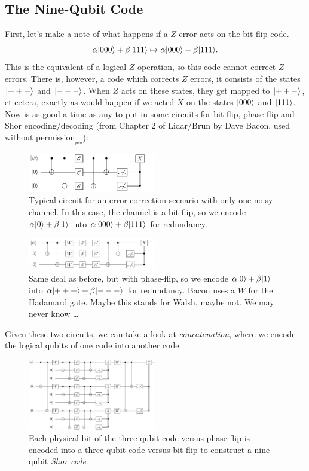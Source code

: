 \documentclass[10pt,a4paper, english]{scrartcl}
\begin{document}
\subsection{The Nine-Qubit Code}
First, let's make a note of what happens if a $Z$ error acts on the bit-flip code.
\begin{equation}
\alpha {\left\vert{000}\right\rangle} + \beta {\left\vert{111}\right\rangle} \mapsto \alpha {\left\vert{000}\right\rangle} - \beta {\left\vert{111}\right\rangle}. 
\end{equation}
This is the equivalent of a logical $Z$ operation, so this code cannot correct $Z$ errors. 
There is, however, a code which corrects $Z$ errors, it consists of the states ${\left\vert{+++}\right\rangle}$ and ${\left\vert{---}\right\rangle}$. When $Z$ acts on these states, they get mapped to ${\left\vert{++-}\right\rangle}$, et cetera, exactly as would happen if we acted $X$ on the states ${\left\vert{000}\right\rangle}$ and ${\left\vert{111}\right\rangle}$. Now is as good a time as any to put in some circuits for bit-flip, phase-flip and Shor encoding/decoding (from Chapter 2 of Lidar/Brun by Dave Bacon, used without permission$_{_\textsf{yolo}}$):
\begin{figure}[!h]
\centering
\includegraphics[width=0.5\textwidth]{bacon_bf_repetition_circuit.png}
\caption{Typical circuit for an error correction scenario with only one noisy channel. In this case, the channel is a bit-flip, so we encode $\alpha {\left\vert{0}\right\rangle} + \beta {\left\vert{1}\right\rangle}$ into $\alpha {\left\vert{000}\right\rangle} + \beta {\left\vert{111}\right\rangle}$ for redundancy.}
\end{figure}

\begin{figure}[!h]
\centering
\includegraphics[width=0.5\textwidth]{bacon_pf_repetition_circuit.png}
\caption{Same deal as before, but with phase-flip, so we encode $\alpha {\left\vert{0}\right\rangle} + \beta {\left\vert{1}\right\rangle}$ into $\alpha {\left\vert{+++}\right\rangle} + \beta {\left\vert{---}\right\rangle}$ for redundancy. Bacon uses a $W$ for the Hadamard gate. Maybe this stands for Walsh, maybe not. We may never know \ldots}
\end{figure}
Given these two circuits, we can take a look at \emph{concatenation}, where we encode the logical qubits of one code into another code:
\begin{figure}[!h]
\centering
\includegraphics[width=0.5\textwidth]{bacon_9bit_circuit.png}
\caption{Each physical bit of the three-qubit code versus phase flip is encoded into a three-qubit code versus bit-flip to construct a nine-qubit \emph{Shor code}.}
\end{figure}
\end{document}

